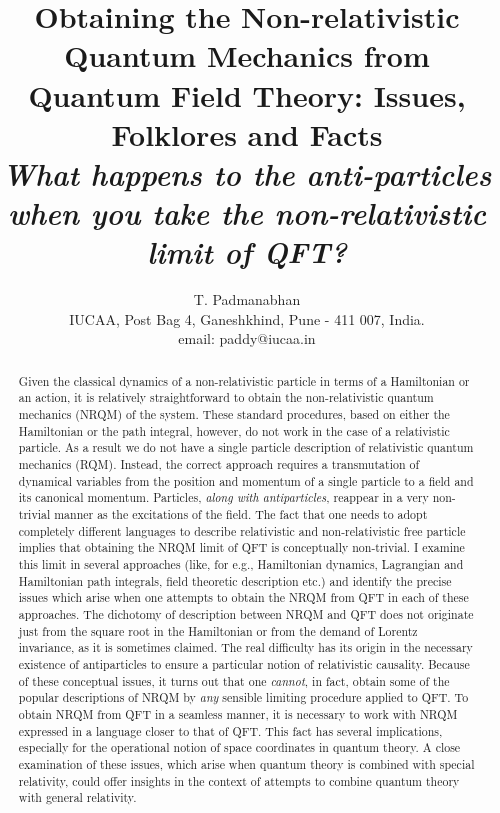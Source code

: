 \documentclass{article}
\title{Obtaining the Non-relativistic Quantum Mechanics from Quantum Field Theory: Issues, Folklores and Facts\\
\vskip 1.1cm
{\textit{\Large What happens to the anti-particles when you take the non-relativistic limit of QFT?\\
\vskip 2cm
}}}
\author{T. Padmanabhan\\
IUCAA, Post Bag 4, Ganeshkhind,
 Pune - 411 007, India.\\
email: paddy@iucaa.in}
\begin{document}
\maketitle



\begin{abstract}
 Given the classical dynamics of a non-relativistic particle in terms of a Hamiltonian or an action, it is relatively straightforward to obtain the non-relativistic quantum mechanics (NRQM) of the system. These standard procedures, based on either the Hamiltonian or the path integral, however, do not work in the case of a relativistic particle. As a result we do not have a single particle description of relativistic quantum mechanics (RQM). Instead, the correct approach requires a transmutation of dynamical variables from the position and momentum of a  single particle to a field and its canonical momentum. Particles, \textit{along with antiparticles},  reappear in a very non-trivial manner as the excitations of the field. The fact that one needs to adopt  completely different languages to describe  relativistic and non-relativistic free particle implies that obtaining the NRQM limit of QFT is conceptually non-trivial. I examine this limit in several approaches (like, for e.g., Hamiltonian dynamics, Lagrangian and Hamiltonian path integrals, field theoretic description etc.) and identify the precise issues which arise when one attempts to obtain the NRQM from QFT in each of these approaches. The dichotomy of description between NRQM and QFT  does not originate just  from the square root in the Hamiltonian or from the demand of Lorentz invariance, as it is sometimes claimed. The real difficulty has its origin in the necessary existence of antiparticles to ensure a particular notion of relativistic causality. Because of these conceptual issues, it turns out that one \textit{cannot}, in fact,  obtain  some of the popular descriptions of NRQM by \textit{any} sensible limiting procedure applied to QFT. To obtain NRQM from QFT in a  seamless manner, it is necessary to 
 work with NRQM expressed in a language  closer to that of QFT. This fact has several implications, especially for the operational notion of space coordinates in quantum theory. A close examination of these issues, which arise when quantum theory is combined with  special relativity,  could offer insights in the context of attempts to combine quantum theory with general relativity.  
\end{abstract}

\tableofcontents
\end{document}
